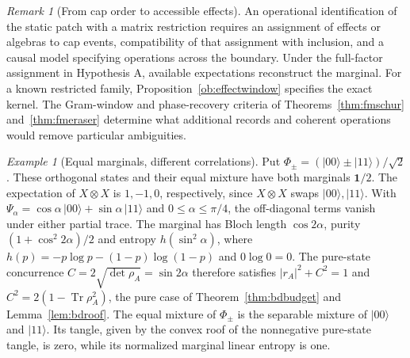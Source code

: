 \documentclass[aps,pra,onecolumn,superscriptaddress,nofootinbib,10pt]{revtex4-2}
\theoremstyle{definition}
\theoremstyle{remark}
\newtheorem{remark}[theorem]{Remark}
\newtheorem{example}[theorem]{Example}
\begin{document}
\begin{remark}[From cap order to accessible effects]\label{ob:capbridge}
An operational identification of the static patch with a matrix
restriction requires an assignment of effects or algebras to cap events,
compatibility of that assignment with inclusion, and a causal model
specifying operations across the boundary. Under the full-factor
assignment in Hypothesis A, available expectations reconstruct the
marginal. For a known restricted family, Proposition~\ref{ob:effectwindow}
specifies the exact kernel. The Gram-window and phase-recovery
criteria of Theorems~\ref{thm:fmschur} and~\ref{thm:fmeraser}
determine what additional records and coherent operations would
remove particular ambiguities.
\end{remark}

\begin{example}[Equal marginals, different correlations]\label{ob:blindbell}
Put \(\Phi_\pm=(|00\rangle\pm|11\rangle)/\sqrt2\). These orthogonal
states and their equal mixture have both marginals \(\mathbf1/2\).
The expectation of \(X\otimes X\) is \(1,-1,0\), respectively, since
\(X\otimes X\) swaps \(|00\rangle,|11\rangle\). With
\(\Psi_\alpha=\cos\alpha\,|00\rangle+\sin\alpha\,|11\rangle\) and
\(0\le\alpha\le\pi/4\), the off-diagonal terms vanish under either
partial trace. The marginal has Bloch length \(\cos 2\alpha\),
purity \((1+\cos^2 2\alpha)/2\) and entropy \(h(\sin^2\alpha)\), where
\(h(p)=-p\log p-(1-p)\log(1-p)\) and \(0\log0=0\).
The pure-state concurrence \(C=2\sqrt{\det\rho_A}=\sin 2\alpha\) therefore
satisfies \(|r_A|^2+C^2=1\) and \(C^2=2(1-\operatorname{Tr}\rho_A^2)\),
the pure case of Theorem~\ref{thm:bdbudget} and Lemma~\ref{lem:bdroof}.
The equal mixture of \(\Phi_\pm\) is the separable mixture of
\(|00\rangle\) and \(|11\rangle\). Its tangle, given by the convex
roof of the nonnegative pure-state tangle, is zero, while its
normalized marginal linear entropy is one.
\end{example}
\end{document}
